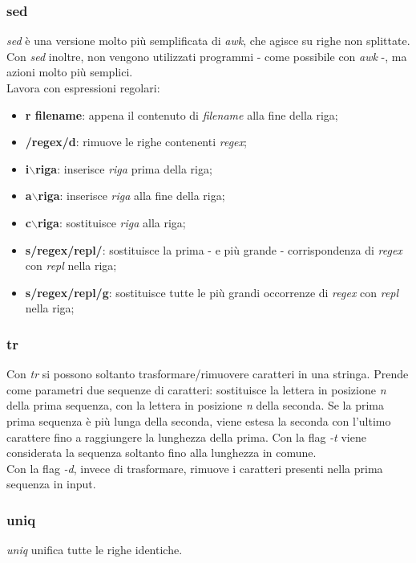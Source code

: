 \subsubsection{sed}
\textit{sed} è una versione molto più semplificata di \textit{awk}, che agisce su righe non splittate. Con \textit{sed} inoltre, non vengono utilizzati programmi - come possibile con \textit{awk} -, ma azioni molto più semplici. \\
Lavora con espressioni regolari:
\begin{itemize}
    \item \textbf{r filename}: appena il contenuto di \textit{filename} alla fine della riga;
    \item \textbf{/regex/d}: rimuove le righe contenenti \textit{regex};
    \item \textbf{i$\backslash$riga}: inserisce \textit{riga} prima della riga;
    \item \textbf{a$\backslash$riga}: inserisce \textit{riga} alla fine della riga;
    \item \textbf{c$\backslash$riga}: sostituisce \textit{riga} alla riga;
    \item \textbf{s/regex/repl/}: sostituisce la prima - e più grande - corrispondenza di \textit{regex} con \textit{repl} nella riga;
    \item \textbf{s/regex/repl/g}: sostituisce tutte le più grandi occorrenze di \textit{regex} con \textit{repl} nella riga;
\end{itemize}

\subsubsection{tr}
Con \textit{tr} si possono soltanto trasformare/rimuovere caratteri in una stringa. Prende come parametri due sequenze di caratteri: sostituisce la lettera in posizione \textit{n} della prima sequenza, con la lettera in posizione \textit{n} della seconda. Se la prima prima sequenza è più lunga della seconda, viene estesa la seconda con l'ultimo carattere fino a raggiungere la lunghezza della prima. Con la flag \textit{-t} viene considerata la sequenza soltanto fino alla lunghezza in comune. \\
Con la flag \textit{-d}, invece di trasformare, rimuove i caratteri presenti nella prima sequenza in input.

\subsubsection{uniq}
\textit{uniq} unifica tutte le righe identiche.

